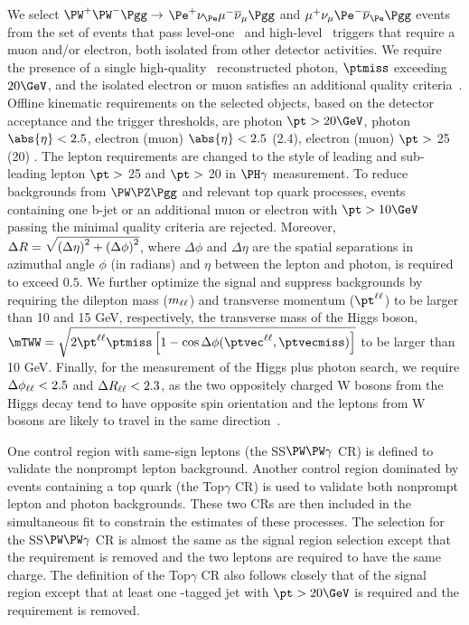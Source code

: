 We select $\PW^+\PW^-\Pgg\to$ $\Pe^+\nu_{\Pe}\mu^-\overline{\nu}_{\mu}\Pgg$ and $\mu^+\nu_{\mu}\Pe^-\overline{\nu}_{\Pe}\Pgg$ events from the set of events that pass level-one~\cite{Sirunyan:2020zal} and high-level~\cite{Khachatryan:2016bia} triggers that require a muon and/or electron, both isolated from other detector activities. We require the presence of a single high-quality~\cite{CMS:EGM-14-001} reconstructed photon, $\ptmiss$ exceeding $20\GeV$, and the isolated electron or muon satisfies an additional quality criteria~\cite{Sirunyan:2018,Khachatryan:2015hwa}. Offline kinematic requirements on the selected objects, based on the detector acceptance and the trigger thresholds, are photon $\pt>20\GeV$, photon $\abs{\eta}<2.5$, electron (muon) $\abs{\eta}< 2.5$ (2.4), electron (muon) $\pt > $ 25 (20) \GeV. The lepton requirements are changed to the style of leading and sub-leading lepton $\pt>$ 25 \GeV and $\pt>$ 20 \GeV in $\PH\gamma$ measurement. To reduce backgrounds from $\PW\PZ\Pgg$ and relevant top quark processes, events containing one b-jet or an additional muon or electron with $\pt > 10\GeV$ passing the minimal quality criteria are rejected. Moreover, $\Delta R = \sqrt{\smash[b]{\left(\Delta\eta\right)^2 + \left(\Delta\phi\right)^2}}$, where $\Delta \phi$ and $\Delta \eta$ are the spatial separations in azimuthal angle $\phi$ (in radians) and $\eta$ between the lepton and photon, is required to exceed $0.5$. We further optimize the signal and suppress backgrounds by requiring the dilepton mass ($m_{\ell\ell}$) and transverse momentum ($\ptll$) to be larger than 10 and 15 GeV, respectively, the transverse mass of the Higgs boson, $\mTWW = \sqrt{2 \ptll \ptmiss \left[1 - \cos\Delta\phi(\ptvecll, \ptvecmiss)\right]}$ to be larger than 10 GeV. Finally, for the measurement of the Higgs plus photon search, we require $\Delta\phi_{\ell\ell}<2.5$ and $\Delta R_{\ell\ell}<2.3$, as the two oppositely charged W bosons from the Higgs decay tend to have opposite spin orientation and the leptons from W bosons are likely to travel in the same direction~\cite{Dittmar:1996ss}.

One control region with same-sign leptons (the SS$\PW\PW\gamma$ CR) is defined to validate the nonprompt lepton background. Another control region dominated by events containing a top quark (the Top$\gamma$ CR) is used to validate both nonprompt lepton and photon backgrounds. These two CRs are then included in the simultaneous fit to constrain the estimates of these processes. The selection for the SS$\PW\PW\gamma$ CR is almost the same as the signal region selection except that the \mTWW requirement is removed and the two leptons are required to have the same charge. The definition of the Top$\gamma$ CR also follows closely that of the signal region except that 
at least one {\cPqb}-tagged jet with $\pt > 20\GeV$ is required and the \mTWW requirement is removed. 

